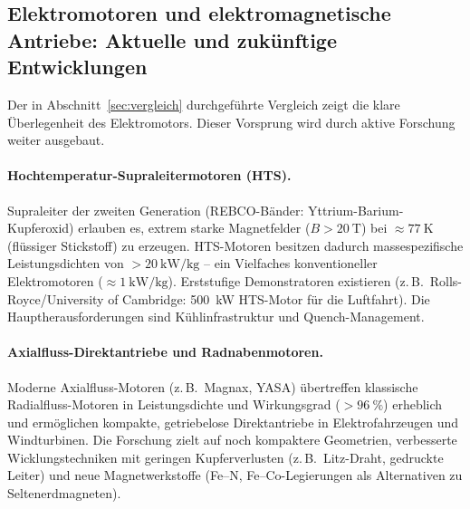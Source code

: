 ﻿\documentclass[12pt, a4paper]{report}
\theoremstyle{definition}
\theoremstyle{remark}
\begin{document}
\subsection{Elektromotoren und elektromagnetische Antriebe: Aktuelle und
               zukünftige Entwicklungen}

Der in Abschnitt~\ref{sec:vergleich} durchgeführte Vergleich zeigt die klare
Überlegenheit des Elektromotors. Dieser Vorsprung wird durch aktive Forschung
weiter ausgebaut.

\paragraph{Hochtemperatur-Supraleitermotoren (HTS).}
Supraleiter der zweiten Generation (REBCO-Bänder: Yttrium-Barium-Kupferoxid)
erlauben es, extrem starke Magnetfelder ($B > \SI{20}{\tesla}$) bei $\approx
\SI{77}{\kelvin}$ (flüssiger Stickstoff) zu erzeugen. HTS-Motoren besitzen
dadurch massespezifische Leistungsdichten von $>\SI{20}{\kilo\watt\per\kilogram}$
-- ein Vielfaches konventioneller Elektromotoren ($\approx \SI{1}{\kilo\watt\per\kilogram}$).
Erststufige Demonstratoren existieren (z.\,B.\ Rolls-Royce/University of
Cambridge: \SI{500}{\kilo\watt} HTS-Motor für die Luftfahrt). Die Hauptherausforderungen
sind Kühlinfrastruktur und Quench-Management.

\paragraph{Axialfluss-Direktantriebe und Radnabenmotoren.}
Moderne Axialfluss-Motoren (z.\,B.\ Magnax, YASA) übertreffen klassische
Radialfluss-Motoren in Leistungsdichte und Wirkungsgrad ($>\SI{96}{\percent}$)
erheblich und ermöglichen kompakte, getriebelose Direktantriebe in
Elektrofahrzeugen und Windturbinen. Die Forschung zielt auf noch kompaktere
Geometrien, verbesserte Wicklungstechniken mit geringen Kupferverlusten
(z.\,B.\ Litz-Draht, gedruckte Leiter) und neue Magnetwerkstoffe
(Fe--N, Fe--Co-Legierungen als Alternativen zu Seltenerdmagneten).
\end{document}
